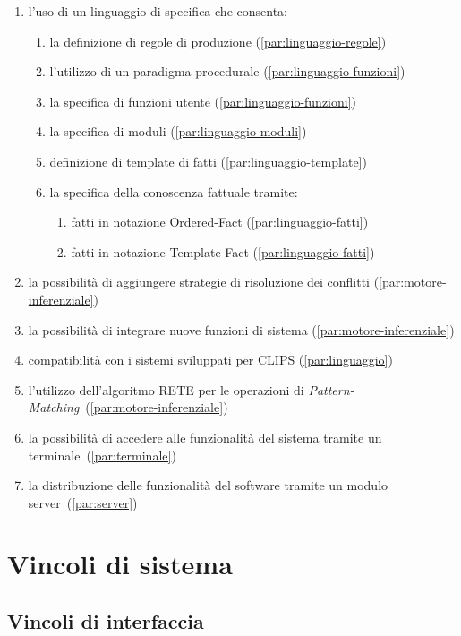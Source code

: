 \begin{enumerate}
	\item l'uso di un linguaggio di specifica che consenta:
		\begin{enumerate}
			\item la definizione di regole di produzione (\ref{par:linguaggio-regole})
			\item l'utilizzo di un paradigma procedurale (\ref{par:linguaggio-funzioni})
			\item la specifica di funzioni utente (\ref{par:linguaggio-funzioni})
			\item la specifica di moduli (\ref{par:linguaggio-moduli})
			\item definizione di template di fatti (\ref{par:linguaggio-template})
			\item la specifica della conoscenza fattuale tramite:
				\begin{enumerate}
					\item fatti in notazione Ordered-Fact (\ref{par:linguaggio-fatti})
					\item fatti in notazione Template-Fact (\ref{par:linguaggio-fatti})
				\end{enumerate}
		\end{enumerate}
	\item la possibilità di aggiungere strategie di risoluzione dei conflitti (\ref{par:motore-inferenziale})
	\item la possibilità di integrare nuove funzioni di sistema (\ref{par:motore-inferenziale})
	\item compatibilità con i sistemi sviluppati per CLIPS (\ref{par:linguaggio})
	\item l'utilizzo dell'algoritmo RETE per le operazioni di \emph{Pattern-Matching}~(\ref{par:motore-inferenziale})
	\item la possibilità di accedere alle funzionalità del sistema tramite un terminale~(\ref{par:terminale})
	\item la distribuzione delle funzionalità del software tramite un modulo server~(\ref{par:server})
\end{enumerate}


\section{Vincoli di sistema}
\vincoliinit
\subsection{Vincoli di interfaccia}

